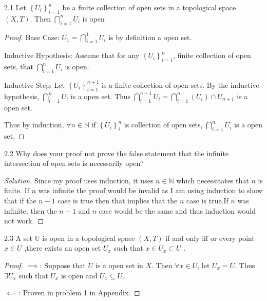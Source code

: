 \documentclass{article}
\newcommand{\N}{\mathbb{N}}
\newenvironment{solution}
{\renewcommand\qedsymbol{$\blacksquare$}\begin{proof}[Solution]}
{\end{proof}}
\begin{document}
    

\begin{claim}{2.1}\label{Claim 2.1.}
    Let $\left\{ U_i \right\}_{i = 1}^{n}$ be a finite collection of open sets in a topological space $(X, T)$. Then $\bigcap_{i = 1}^n U_i$ is open   
\end{claim}
\begin{proof}
    Base Case: $U_1 = \bigcap_{i = 1}^1 U_i$ is by definition a open set. 
    
    Inductive Hypothesis: Assume that for any $\left\{ U_i \right\}_{i = 1}^n$, finite collection of open sets, that $\bigcap_{i = 1}^n U_i$ is open. 
    
    Inductive Step: Let $\left\{ U_i \right\}_{i = 1}^{n + 1}$ is a finite collection of open sets. By the inductive hypothesis, $\bigcap_{i = 1}^n U_i$ is a open set. Thus $\bigcap_{i = 1}^{n + 1} U_i = \bigcap_{i = 1}^n \left(U_i\right) \cap U_{n + 1}$ is a open set. 
    
    
    Thus by induction, $\forall n \in \N$ if $\left\{ U_i \right\}_i^n$ is collection of open sets,  $\bigcap_{i = 1}^n U_i$ is a open set.  
\end{proof}

\bigskip

\begin{PROB}{2.2}\label{Problem 2.2.}
    Why does your proof not prove the false statement that the infinite intersection of open sets is necessarily open?
\end{PROB}
\begin{solution}
    Since my proof uses induction, it uses $n \in \N$ which necessitates that $n$ is finite. If $n$ was infinite the proof would be invalid as I am using induction to show that if the $n - 1$ case is true then that implies that the $n$ case is true.If $n$ was infinite, then the $n - 1$ and $n$ case would be the same and thus induction would not work.          
\end{solution}

\bigskip

\begin{claim}{2.3}\label{Claim 2.3.}
    A set U is open in a topological space $(X, T)$ if and only iff or every point $x \in U$ ,there exists an open set $U_x$ such that $x \in U_x \subset U$ .
\end{claim}
\begin{proof}
    $\implies$: Suppose that $U$ is a open set in $X$. Then $\forall x \in U$, let $U_x = U$. Thus $\exists U_x$ such that $U_x$ is open and $U_x \subseteq U$.
    
    $\impliedby$: Proven in problem 1 in Appendix.   
\end{proof}
\end{document}
